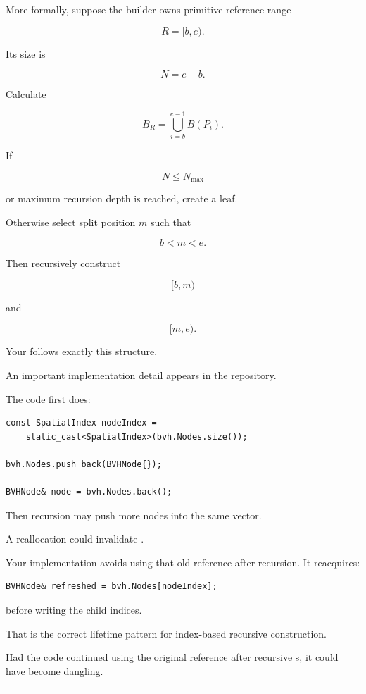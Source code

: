 More formally, suppose the builder owns primitive reference range

\[
R=[b,e).
\]

Its size is

\[
N=e-b.
\]

Calculate

\[
B_R=\bigcup_{i=b}^{e-1}B(P_i).
\]

If

\[
N\le N_{\max}
\]

or maximum recursion depth is reached, create a leaf.

Otherwise select split position \(m\) such that

\[
b<m<e.
\]

Then recursively construct

\[
[b,m)
\]

and

\[
[m,e).
\]

Your  follows exactly this structure.

An important implementation detail appears in the repository.

The code first does:

\begin{verbatim}
const SpatialIndex nodeIndex =
    static_cast<SpatialIndex>(bvh.Nodes.size());

bvh.Nodes.push_back(BVHNode{});

BVHNode& node = bvh.Nodes.back();
\end{verbatim}

Then recursion may push more nodes into the same vector.

A  reallocation could invalidate .

Your implementation avoids using that old reference after recursion. It reacquires:

\begin{verbatim}
BVHNode& refreshed = bvh.Nodes[nodeIndex];
\end{verbatim}

before writing the child indices.

That is the correct lifetime pattern for index-based recursive construction.

Had the code continued using the original  reference after recursive s, it could have become dangling.

\begin{center}\rule{0.5\linewidth}{0.5pt}\end{center}

